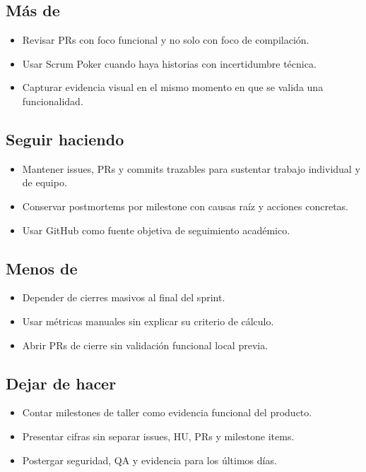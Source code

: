 \documentclass[11pt,a4paper]{article}
\begin{document}
\subsection{Más de}

\begin{itemize}[leftmargin=1.5em]
\item Revisar PRs con foco funcional y no solo con foco de compilación.
\item Usar Scrum Poker cuando haya historias con incertidumbre técnica.
\item Capturar evidencia visual en el mismo momento en que se valida una funcionalidad.
\end{itemize}

\subsection{Seguir haciendo}

\begin{itemize}[leftmargin=1.5em]
\item Mantener issues, PRs y commits trazables para sustentar trabajo individual y de equipo.
\item Conservar postmortems por milestone con causas raíz y acciones concretas.
\item Usar GitHub como fuente objetiva de seguimiento académico.
\end{itemize}

\subsection{Menos de}

\begin{itemize}[leftmargin=1.5em]
\item Depender de cierres masivos al final del sprint.
\item Usar métricas manuales sin explicar su criterio de cálculo.
\item Abrir PRs de cierre sin validación funcional local previa.
\end{itemize}

\subsection{Dejar de hacer}

\begin{itemize}[leftmargin=1.5em]
\item Contar milestones de taller como evidencia funcional del producto.
\item Presentar cifras sin separar issues, HU, PRs y milestone items.
\item Postergar seguridad, QA y evidencia para los últimos días.
\end{itemize}
\end{document}
